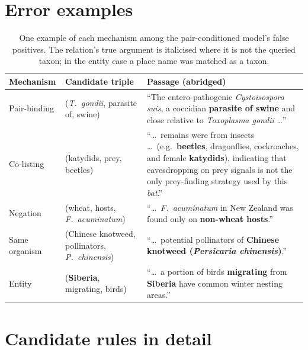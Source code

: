\documentclass[11pt]{article}
\begin{document}
\section{Error examples}
\label{app:examples}

\begin{table}[t]\centering\small
\begin{tabular}{@{}llp{}@{}}
\toprule
Mechanism & Candidate triple & Passage (abridged) \\
\midrule
Pair-binding & (\emph{T.\ gondii}, parasite of, swine) &
``The entero-pathogenic \emph{Cystoisospora suis}, a coccidian \textbf{parasite of swine} and close
relative to \emph{Toxoplasma gondii} \ldots'' \\[1pt]
Co-listing & (katydids, prey, beetles) &
``\ldots\ remains were from insects \ldots\ (e.g.\ \textbf{beetles}, dragonflies, cockroaches, and
female \textbf{katydids}), indicating that eavesdropping on prey signals is not the only
prey-finding strategy used by this \emph{bat}.'' \\[1pt]
Negation & (wheat, hosts, \emph{F.\ acuminatum}) &
``\ldots\ \emph{F.\ acuminatum} in New Zealand was found only on \textbf{non-wheat hosts}.'' \\[1pt]
Same organism & (Chinese knotweed, pollinators, \emph{P.\ chinensis}) &
``\ldots\ potential pollinators of \textbf{Chinese knotweed (\emph{Persicaria chinensis})}.'' \\[1pt]
Entity & (\textbf{Siberia}, migrating, birds) &
``\ldots\ a portion of birds \textbf{migrating} from \textbf{Siberia} have common winter nesting
areas.'' \\
\bottomrule
\end{tabular}
\caption{One example of each mechanism among the pair-conditioned model's false positives. The
relation's true argument is italicised where it is not the queried taxon; in the entity case a
place name was matched as a taxon.}
\label{tab:examples}
\end{table}

\section{Candidate rules in detail}
\label{app:rules}
\end{document}
